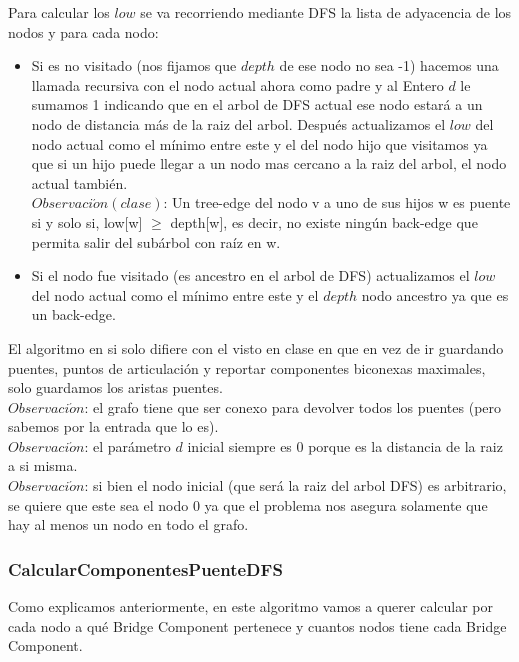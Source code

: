 Para calcular los $low$ se va recorriendo mediante DFS la lista de adyacencia de los nodos y para cada nodo:
\begin{itemize}
	\item Si es no visitado (nos fijamos que $depth$ de ese nodo no sea -1) hacemos una llamada recursiva con el nodo
	actual ahora como padre y al Entero $d$ le sumamos 1 indicando que en el arbol de DFS actual ese nodo
	estará a un nodo de distancia más de la raiz del arbol. Después actualizamos el $low$ del nodo actual
	como el mínimo entre este y el del nodo hijo que visitamos ya que si un hijo puede llegar a un nodo
	mas cercano a la raiz del arbol, el nodo actual también. \\
	$Observaci\acute{o}n (clase)$: Un tree-edge del nodo v a uno de sus hijos w es puente si y solo si, low[w] $\ge$ depth[w], es decir, 
	no existe ning\'un back-edge que permita salir del sub\'arbol con ra\'iz en w.
	\item Si el nodo fue visitado (es ancestro en el arbol de DFS) actualizamos el $low$ del nodo actual
	como el mínimo entre este y el $depth$ nodo ancestro ya que es un back-edge.
\end{itemize}

El algoritmo en si solo difiere con el visto en clase en que en vez de ir guardando puentes, puntos de 
articulación y reportar componentes biconexas maximales, solo guardamos los aristas puentes. \\

$Observaci\acute{o}n$: el grafo tiene que ser conexo para devolver todos los puentes (pero sabemos por la entrada que lo es). \\

$Observaci\acute{o}n$: el parámetro $d$ inicial siempre es 0 porque es la distancia de la raiz a si misma. \\

$Observaci\acute{o}n$: si bien el nodo inicial (que será la raiz del arbol DFS) es arbitrario, se quiere que
este sea el nodo 0 ya que el problema nos asegura solamente que hay al menos un nodo en todo el grafo. \\

\subsubsection*{CalcularComponentesPuenteDFS}

Como explicamos anteriormente, en este algoritmo vamos a querer calcular por cada nodo a qué Bridge Component pertenece
y cuantos nodos tiene cada Bridge Component. \\

